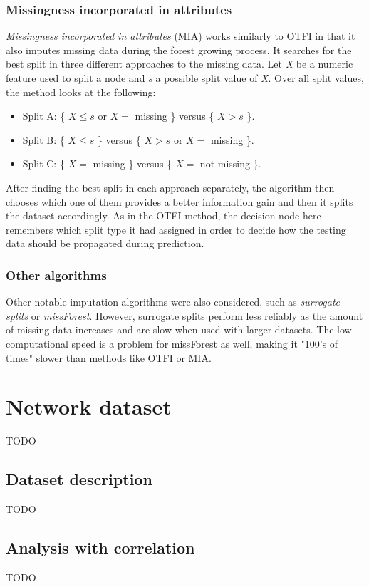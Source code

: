 \documentclass[11pt]{article}
\begin{document}
      \subsubsection{Missingness incorporated in attributes}
        {\it Missingness incorporated in attributes}\cite{mia} (MIA) works similarly to OTFI in that it also imputes missing data during the forest growing process. It searches for the best split in three different approaches to the missing data. Let {\it X} be a numeric feature used to split a node and {\it s} a possible split value of {\it X}. Over all split values, the method looks at the following:
        \begin{itemize}
        \item Split A: \{ $X \leq s$ or $X =$ missing \} versus \{ $X > s$ \}.
        \item Split B: \{ $X \leq s$ \} versus \{ $X > s$ or $X =$ missing \}.
        \item Split C: \{ $X =$ missing \} versus \{ $X =$ not missing \}.
        \end{itemize}
        After finding the best split in each approach separately, the algorithm then chooses which one of them provides a better information gain and then it splits the dataset accordingly. As in the OTFI method, the decision node here remembers which split type it had assigned in order to decide how the testing data should be propagated during prediction.
      \subsubsection{Other algorithms}
        Other notable imputation algorithms were also considered, such as {\it surrogate splits}\cite{splits} or {\it missForest}\cite{otfi}. However, surrogate splits perform less reliably as the amount of missing data increases\cite{splits} and are slow when used with larger datasets.\cite{rsf} The low computational speed is a problem for missForest as well, making it "100's of times" slower than methods like OTFI or MIA.\cite{otfi}
  \section{Network dataset}
    {\color{red}TODO}
    \subsection{Dataset description}
      {\color{red}TODO}
    \subsection{Analysis with correlation}
      {\color{red}TODO}
\end{document}
